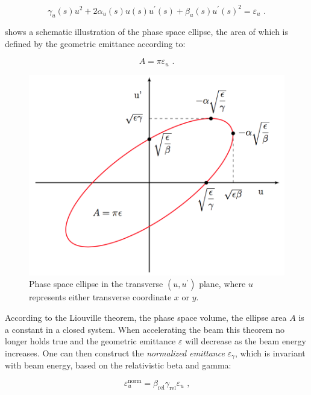 \begin{equation}
    \gamma_{u}(s) u^{2} + 2 \alpha_{u}(s) u(s) u^{\prime}(s) + \beta_{u}(s) u^{\prime}(s)^{2} = \varepsilon_u \text{ .}
    \label{equation:ellipse_equation}
\end{equation}

 shows a schematic illustration of the phase space ellipse, the area of which is defined by the geometric emittance according to:

\begin{equation}
    A = \pi \varepsilon_u \text{ .}
    \label{equation:phase_space_ellipse_area}
\end{equation}

\begin{figure}[!htb]
    \begin{center}
    \includegraphics[width = 0.85\linewidth]{Figures/Chapter2/Phase_Space.png}
    \caption{Phase space ellipse in the transverse \((u, u^{\prime})\) plane, where \(u\) represents either transverse coordinate \(x\) or \(y\).}
    \label{figure:phase_space_ellipse}
    \end{center}
\end{figure}

According to the Liouville theorem, the phase space volume, the ellipse area \(A\) is a constant in a closed system.
When accelerating the beam this theorem no longer holds true and the geometric emittance \(\varepsilon\) will decrease as the beam energy increases.
One can then construct the \emph{normalized emittance} \(\varepsilon_{\gamma}\), which is invariant with beam energy, based on the relativistic beta and gamma:

\begin{equation}
    \varepsilon_u^{\mathrm{norm}} = \beta_{\mathrm{rel}} \gamma_{\mathrm{rel}} \varepsilon_u \text{ ,}
    \label{equation:normalized_emittance}
\end{equation}

